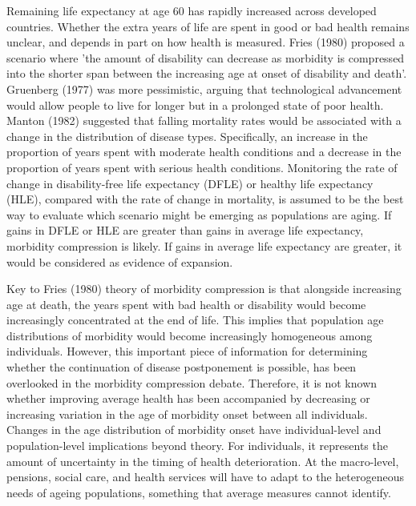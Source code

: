 Remaining life expectancy at age 60 has rapidly increased across developed 
countries.\citep{mathers2015causes} Whether the extra years of life are spent 
in good or bad health remains unclear, and depends in part on how health is 
measured.\citep{christensen2008exceptional,christensen2009ageing,parker2007health,
beltran2015past,beltran2014going,fries2011compression} Fries (1980) proposed 
a scenario where 'the amount of disability can decrease as morbidity is compressed 
into the shorter span between the increasing age at onset of disability and 
death'.\citep{fries1980aging} Gruenberg (1977) was more pessimistic, arguing 
that technological advancement would allow people to live for longer but in 
a prolonged state of poor health.\citep{gruenberg1977failures} Manton (1982) 
suggested that falling mortality rates would be associated with a change in 
the distribution of disease types.\citep{manton1982changing} Specifically, 
an increase in the proportion of years spent with moderate health conditions 
and a decrease in the proportion of years spent with serious health conditions. 
Monitoring the rate of change in disability-free life expectancy (DFLE) or 
healthy life expectancy (HLE), compared with the rate of change in mortality, 
is assumed to be the best way to evaluate which scenario might be emerging 
as populations are aging.\citep{robine1991healthy,robine1998examination,
sanders1964measuring,sullivan1971single}  If gains in DFLE or HLE are greater 
than gains in average life expectancy, morbidity compression is likely. If 
gains in average life expectancy are greater, it would be considered as evidence 
of expansion.

Key to Fries (1980) theory of morbidity compression is that alongside increasing 
age at death, the years spent with bad health or disability would become 
increasingly concentrated at the end of life. This implies that population 
age distributions of morbidity would become increasingly homogeneous among 
individuals. However, this important piece of information for determining 
whether the continuation of disease postponement is possible, has been 
overlooked in the morbidity compression debate.\citep{stallard2016compression}
Therefore, it is not known whether improving average health has been accompanied 
by decreasing or increasing variation in the age of morbidity onset between 
all individuals. Changes in the age distribution of morbidity onset have 
individual-level and population-level implications beyond theory. For individuals, 
it represents the amount of uncertainty in the timing of health deterioration. 
At the macro-level, pensions, social care, and health services will have to 
adapt to the heterogeneous needs of ageing populations, something that average 
measures cannot identify.\citep{van2018case}

